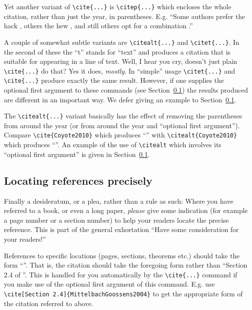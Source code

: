 \documentclass[times, doublespace]{anzsauth}
\begin{document}
Yet another variant of \verb!\cite{...}! is \verb!\citep{...}! which
encloses the whole citation, rather than just the year, in
parentheses.  E.g. ``Some authors prefer the hack \citep{Cook1966},
others the hew \citep{Moore1967}, and still others opt for a
combination \citep{CookMoore1968}.''

A couple of somewhat subtle variants are \verb!\citealt{...}! and
\verb!\citet{...}!.  In the second of these the ``t'' stands for
``text'' and produces a citation that is suitable for appearing
in a line of text.  Well, I hear you cry, doesn't just plain
\verb!\cite{...}! do that?  Yes it does, \emph{mostly}.  In
``simple'' usage \verb!\citet{...}! and \verb!\cite{...}! produce
exactly the same result.  However, if one supplies the optional
first argument to these commands (see Section~\ref{sec:locPrecise})
the results produced are different in an important way.  We defer
giving an example to Section~\ref{sec:locPrecise}.

The \verb!\citealt{...}! variant basically has the effect of removing
the parentheses from around the year (or from around the year and
``optional first argument'').  Compare \verb!\cite{Coyote2010}! which
produces ``\cite{Coyote2010}'' with \verb!\citealt{Coyote2010}! which
produces ``\citealt{Coyote2010}''.  An example of the use of
\verb!\citealt!  which involves its ``optional first argument''
is given in Section~\ref{sec:locPrecise}.

\subsection{Locating references precisely}
\label{sec:locPrecise}

Finally a desideratum, or a plea, rather than a rule as such: Where
you have referred to a book, or even a long paper, \emph{please}
give some indication (for example a page number or a section number)
to help your readers locate the precise reference.  This is part of
the general exhortation ``Have some consideration for your readers!''

References to specific locations (pages, sections, theorems etc.)
should take the form ``\cite[Section 2.4]{MittelbachGoossens2004}''.
That is, the citation should take the foregoing form rather than
``Section 2.4 of \cite{MittelbachGoossens2004}''.  This is
handled for you automatically by the \verb!\cite{...}! command
if you make use of the optional first argument of this command.
E.g. use \verb!\cite[Section 2.4]{MittelbachGoossens2004}! to get
the appropriate form of the citation referred to above.
\end{document}
